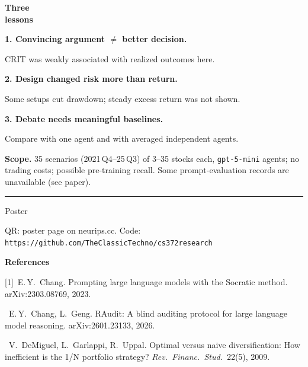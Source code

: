\documentclass{article}
\makeatletter
\newcommand{\codeurl}{https://github.com/TheClassicTechno/cs372research}
\newcommand{\postersmall}{\fontsize{22}{28}\selectfont}
\newcommand{\posterref}{\fontsize{17}{21}\selectfont}
\renewcommand{\makefooter}{%
  \vfill
  {\color{cardinal}\rule{\linewidth}{2mm}}\par\vspace{0.15\np@gap}
  \np@footsize\color{charcoal}
  \begin{minipage}[c]{21cm}\raggedright
    \textbf{\np@session}\par\vspace{0.1em}
    Poster \np@posterid\quad\np@contact\par
    {\posterref QR: poster page on neurips.cc. Code: \texttt{\codeurl}}\par
  \end{minipage}\hfill
  \begin{minipage}[c]{\dimexpr\linewidth-21cm-\np@qr-2\np@gap\relax}\raggedright\posterref
    \textbf{References}\par\vspace{0.15em}
    [1]~E.\,Y.~Chang. Prompting large language models with the Socratic method. arXiv:2303.08769, 2023.\par
    [2]~E.\,Y.~Chang, L.~Geng. RAudit: A blind auditing protocol for large language model reasoning. arXiv:2601.23133, 2026.\par
    [3]~V.~DeMiguel, L.~Garlappi, R.~Uppal. Optimal versus naive diversification: How inefficient is the 1/N portfolio strategy? \emph{Rev.\ Financ.\ Stud.}~22(5), 2009.\par
  \end{minipage}\hfill
  \begin{minipage}[c]{\np@qr}\raggedleft\qrcode[height=\np@qr]{\np@paperurl}\end{minipage}}
\makeatother
\begin{document}
\vspace{0.4cm}
\begin{minipage}[t]{0.13\linewidth}\raggedright
  {\fontsize{34}{40}\selectfont\bfseries\color{cardinal}Three\\lessons\par}
\end{minipage}\hfill
\begin{minipage}[t]{0.275\linewidth}\raggedright
  \textbf{1. Convincing argument $\neq$ better decision.}\par
  {\postersmall CRIT was weakly associated with realized outcomes here.\par}
\end{minipage}\hfill
\begin{minipage}[t]{0.275\linewidth}\raggedright
  \textbf{2. Design changed risk more than return.}\par
  {\postersmall Some setups cut drawdown; steady excess return was not shown.\par}
\end{minipage}\hfill
\begin{minipage}[t]{0.275\linewidth}\raggedright
  \textbf{3. Debate needs meaningful baselines.}\par
  {\postersmall Compare with one agent and with averaged independent agents.\par}
\end{minipage}
\par\vspace{0.6em}
{\postersmall\textbf{Scope.} 35 scenarios (2021\,Q4--25\,Q3) of 3--35 stocks each, \texttt{gpt-5-mini} agents; no
trading costs; possible pre-training recall. Some prompt-evaluation records are unavailable (see paper).\par}

\makefooter
\end{document}
